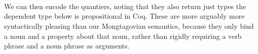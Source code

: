 \begin{code}[hide]%
\>[0]\<%
\\
\>[0][@{}l@{\AgdaIndent{0}}]%
\>[2]\AgdaSpace{}%
\AgdaSymbol{:}\AgdaSpace{}%
\<%
\end{code}
\begin{code}%
\>[0]\<%
\\
\>[0][@{}l@{\AgdaIndent{0}}]%
\>[2]\AgdaSpace{}%
\AgdaSymbol{:}\AgdaSpace{}%
\AgdaSpace{}%
\AgdaSymbol{->}\AgdaSpace{}%
\<%
\end{code}
\begin{code}[hide]%
\>[0]\<%
\\
\>[0][@{}l@{\AgdaIndent{0}}]%
\>[2]\AgdaSpace{}%
\AgdaSpace{}%
\AgdaSpace{}%
\AgdaSpace{}%
\AgdaSpace{}%
\AgdaSymbol{:}\AgdaSpace{}%
\<%
\end{code}

We can then encode the quantiers, noting that they also return just types the
dependent type  below is propositional in Coq. These are more arguably
more syntactically pleasing than our Mongtagovian semantics, because they only
bind a noun and a property about that noun, rather than rigidly requiring a verb
phrase and a noun phrase as arguments.

\begin{code}%
\>[0]\AgdaSpace{}%
\AgdaSymbol{:}\AgdaSpace{}%
\AgdaSymbol{(}\AgdaSpace{}%
\AgdaSymbol{:}\AgdaSpace{}%
\AgdaSymbol{)}\AgdaSpace{}%
\AgdaSpace{}%
\AgdaSymbol{(}\AgdaSpace{}%
\AgdaSymbol{:}\AgdaSpace{}%
\AgdaSpace{}%
\AgdaSpace{}%
\AgdaSymbol{)}\AgdaSpace{}%
\AgdaSpace{}%
\<%
\\
\>[0]\AgdaSpace{}%
\AgdaSpace{}%
\AgdaSpace{}%
\AgdaSymbol{=}\AgdaSpace{}%
\AgdaFunction{Σ[}\AgdaSpace{}%
\AgdaSpace{}%
\AgdaSpace{}%
\AgdaSpace{}%
\AgdaFunction{]}\AgdaSpace{}%
\AgdaSpace{}%
\<%
\\
%
\\[\AgdaEmptyExtraSkip]%
\>[0]\AgdaSpace{}%
\AgdaSymbol{:}\AgdaSpace{}%
\AgdaSymbol{(}\AgdaSpace{}%
\AgdaSymbol{:}\AgdaSpace{}%
\AgdaSymbol{)}\AgdaSpace{}%
\AgdaSpace{}%
\AgdaSymbol{(}\AgdaSpace{}%
\AgdaSymbol{:}\AgdaSpace{}%
\AgdaSpace{}%
\AgdaSpace{}%
\AgdaSymbol{)}\AgdaSpace{}%
\AgdaSpace{}%
\<%
\\
\>[0]\AgdaSpace{}%
\AgdaSpace{}%
\AgdaSpace{}%
\AgdaSymbol{=}\AgdaSpace{}%
\AgdaSymbol{(}\AgdaSpace{}%
\AgdaSymbol{:}\AgdaSpace{}%
\AgdaSymbol{)}\AgdaSpace{}%
\AgdaSpace{}%
\AgdaSpace{}%
\<%
\end{code}

